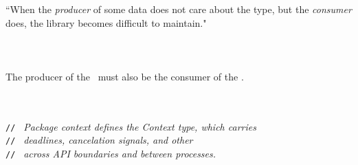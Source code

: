 \documentclass[xelatex,aspectratio=43]{beamer}
\begin{document}
\begin{frame}
	\Large
	``When the \emph{producer} of some data does not care about the type, but the
	\emph{consumer} does, the library becomes difficult to maintain."
\end{frame}

\section{}
\begin{frame}
	\Large
	\\
	The producer of the \interface\ must also be the consumer of the \interface.
\end{frame}

\section{}
\frame{\LARGE \sectionpage}

\begin{frame}
	\inputminted{go}{example2.go}
\end{frame}

\begin{frame}
	\texttt{\color{MidGreen}// }\textit{%
		Package context defines the Context type, which carries}\\
	\texttt{\color{MidGreen}// }\textit{%
		deadlines, cancelation signals, and other \only<2>{\strong{request-scoped}}}\\
	\texttt{\color{MidGreen}// }\textit{%
		 across API boundaries and
		between processes.}
\end{frame}

\begin{frame}
	\begin{enumerate}
	\end{enumerate}
\end{frame}

\begin{frame}
	\begin{multicols}{2}
		\inputminted{go}{example3.go}
		\columnbreak
		\inputminted{go}{example4.go}
	\end{multicols}
\end{frame}
\end{document}
